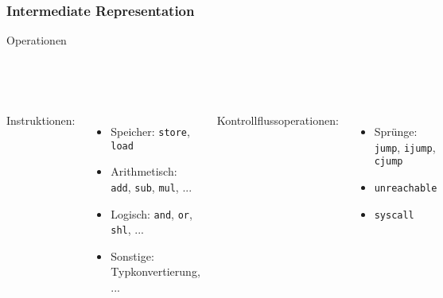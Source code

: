 \begin{frame}
    \frametitle{Intermediate Representation}{Operationen}
    \pause

    ~\\
    ~\\

    \begin{columns}[c]
        Instruktionen:
        \begin{itemize}
            \item Speicher: \texttt{store}, \texttt{load}
            \item Arithmetisch: \texttt{add}, \texttt{sub}, \texttt{mul}, ...
            \item Logisch: \texttt{and}, \texttt{or}, \texttt{shl}, ...
            \item Sonstige: Typkonvertierung, ...
        \end{itemize}

        \pause
        Kontrollflussoperationen:
        \begin{itemize}
            \item Sprünge: \texttt{jump}, \texttt{ijump}, \texttt{cjump}
            \item \texttt{unreachable}
            \item \texttt{syscall}
        \end{itemize}
    \end{columns}
\end{frame}


